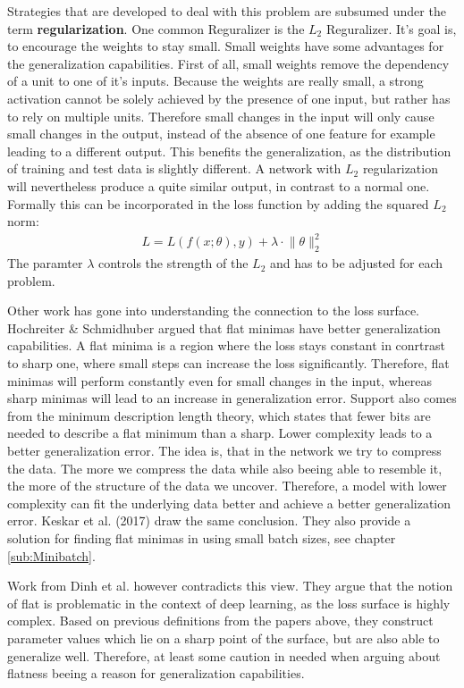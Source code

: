 Strategies that are developed to deal with this problem are subsumed under the
term \textbf{regularization}. One common Reguralizer is the $L_2$ Reguralizer.
It's goal is, to encourage the weights to stay small. Small weights have some
advantages for the generalization capabilities. First of all, small weights
remove the dependency of a unit to one of it's inputs. Because the weights are
really small, a strong activation cannot be solely achieved by the presence of
one input, but rather has to rely on multiple units. Therefore small changes in
the input will only cause small changes in the output, instead of the absence of
one feature for example leading to a different output. This benefits the
generalization, as the distribution of training and test data is slightly
different. A network with $L_2$ regularization will nevertheless produce a quite
similar output, in contrast to a normal one. Formally this can be incorporated
in the loss function by adding the squared $L_2$ norm:
\begin{align}
    L= L(f(x;\theta), y)+\lambda \cdot \lVert \theta \rVert_2^2
\end{align}
The paramter $\lambda$ controls the strength of the $L_2$ and has to be adjusted
for each problem.

Other work has gone into understanding the connection to the loss surface.
Hochreiter \& Schmidhuber \cite{hochreiter1997flat} argued that flat minimas have better
generalization capabilities. A flat minima is a region where the loss stays
constant in conrtrast to sharp one, where small steps can increase the loss
significantly. Therefore, flat minimas will perform constantly even for small
changes in the input, whereas sharp minimas will lead to an increase in
generalization error. Support also comes from the minimum description length
theory, which states that fewer bits are needed to describe a flat minimum than
a sharp. Lower complexity leads to a better generalization error. The idea is,
that in the network we try to compress the data. The more we compress the data
while also beeing able to resemble it, the more of the structure of the data we
uncover. Therefore, a model with lower complexity can fit the underlying data
better and achieve a better generalization error. Keskar et al. (2017) draw the
same conclusion. They also provide a solution for finding flat minimas in using
small batch sizes, see chapter \ref{sub:Minibatch}.

Work from Dinh et al. \cite{dinh2017sharp} however contradicts this view. They
argue that the notion of flat is problematic in the context of deep learning, as
the loss surface is highly complex. Based on previous definitions from the
papers above, they construct parameter values which lie on a sharp point of the
surface, but are also able to generalize well. Therefore, at least some caution
in needed when arguing about flatness beeing a reason for generalization
capabilities.

